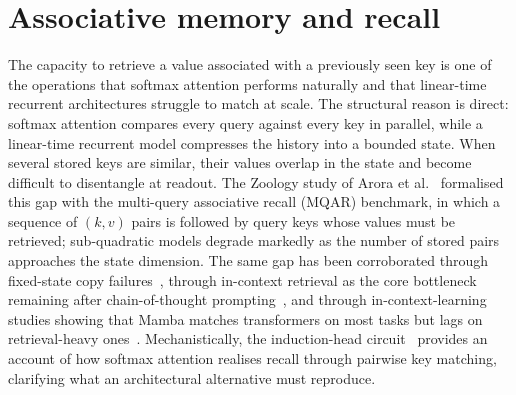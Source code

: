\section{Associative memory and recall}

The capacity to retrieve a value associated with a previously
seen key is one of the operations that softmax attention performs
naturally and that linear-time recurrent architectures struggle
to match at scale. The structural reason is direct: softmax
attention compares every query against every key in parallel,
while a linear-time recurrent model compresses the history into
a bounded state. When several stored keys are similar, their
values overlap in the state and become difficult to disentangle
at readout. The Zoology study of Arora et
al.~\cite{arora2023zoology} formalised this gap with the
multi-query associative recall (MQAR) benchmark, in which a
sequence of $(k, v)$ pairs is followed by query keys whose values
must be retrieved; sub-quadratic models degrade markedly as the
number of stored pairs approaches the state dimension. The same
gap has been corroborated through fixed-state copy
failures~\cite{jelassi2024repeat}, through in-context retrieval
as the core bottleneck remaining after chain-of-thought
prompting~\cite{wen2024rnns}, and through in-context-learning
studies showing that Mamba matches transformers on most tasks
but lags on retrieval-heavy
ones~\cite{park2024mamba,akyurek2024incontext}. Mechanistically,
the induction-head circuit~\cite{olsson2022induction} provides
an account of how softmax attention realises recall through
pairwise key matching, clarifying what an architectural
alternative must reproduce.

